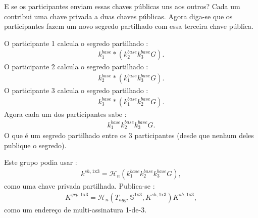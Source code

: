 E se os participantes enviam essas chaves públicas uns aos outros? Cada um contribui uma chave privada a duas chaves públicas. Agora diga-se que os participantes fazem um novo segredo partilhado com essa terceira chave pública.  


O participante 1 calcula o segredo partilhado : 
\begin{align*}
k^{base}_1*(k^{base}_2 k^{base}_3 G) .
\end{align*}
O participante 2 calcula o segredo partilhado : 
\begin{align*}
k^{base}_2*(k^{base}_1 k^{base}_3 G) .
\end{align*}
O participante 3 calcula o segredo partilhado : 
\begin{align*}
k^{base}_3*(k^{base}_1 k^{base}_2 G) .
\end{align*}
Agora cada um dos participantes sabe :
\begin{align*}
k^{base}_1 k^{base}_2 k^{base}_3 G .
\end{align*}
O que é um segredo partilhado entre os 3 participantes (desde que nenhum deles publique o segredo).


Este grupo podia usar : 
\begin{align*}
k^{sh,\textrm{1x3}} = \mathcal{H}_n(k^{base}_1 k^{base}_2 k^{base}_3 G) ,
\end{align*}
como uma chave privada partilhada. Publica-se :
\begin{align*}
K^{grp,\textrm{1x3}} = \mathcal{H}_n(T_{agg},\mathbb{S}^{\textrm{1x3}},K^{sh,\textrm{1x3}}) K^{sh,\textrm{1x3}} ,
\end{align*}
como um endereço de multi-assinatura 1-de-3.

